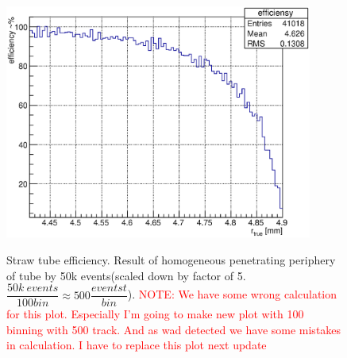 \documentclass[]{article}
\begin{document}
	
	
	\begin{figure}[h!]
	\centering
	\includegraphics[width=0.9\textwidth]{periffEff}
	\label{fig:efficiency}
	\caption{ Straw tube efficiency. Result of homogeneous penetrating periphery of tube by 50k events(scaled down by factor of 5. $\dfrac{50k~events}{100 bin}  \approx 500 \dfrac{eventst}{bin}$). \textcolor{red}{NOTE: We have some wrong calculation for this plot. Especially I'm going to make new plot with 100 binning with 500 track. And as wad detected we have some mistakes in calculation. I have to replace this plot next update} }
	\end{figure}	
	
\end{document}
